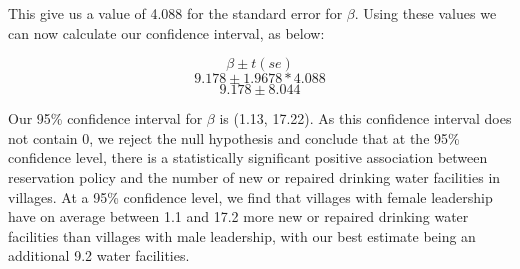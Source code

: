 \documentclass[12pt,letterpaper]{article}
\begin{document}
\begin{enumerate}
	\vspace{.5cm}
	
	
	
	\vspace{.5cm}
	
	This give us a value of 4.088 for the standard error for $\beta$. Using these values we can now calculate our confidence interval, as below:
	
	\[\beta \pm t(se) \]
	\[9.178 \pm 1.9678 * 4.088 \]
	\[9.178 \pm 8.044 \]
	
	Our 95\% confidence interval for $\beta$ is (1.13, 17.22). As this confidence interval does not contain 0, we reject the null hypothesis and conclude that at the 95\% confidence level, there is a statistically significant positive association between reservation policy and the number of new or repaired drinking water facilities in villages. At a 95\% confidence level, we find that villages with female leadership have on average between 1.1 and 17.2 more new or repaired drinking water facilities than villages with male leadership, with our best estimate being an additional 9.2 water facilities.
	
\end{enumerate}
\end{document}
